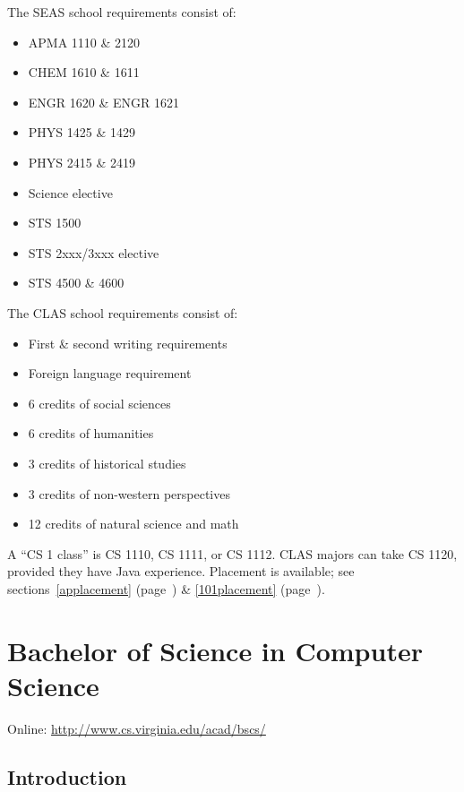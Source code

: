 \documentclass[10pt,letter,twocolumn]{book}
\newenvironment{itemlist}{
\begin{itemize}
\setlength{\itemsep}{0pt}
\setlength{\parskip}{0pt}}
{\end{itemize}}
\newcommand{\mychapter}[2]{\chapter{#1}\renewcommand{\leftmark}{\textsc{#2}}}
\newcommand{\mysection}[1]{\section{#1}\renewcommand{\rightmark}{#1}}
\begin{document}
The SEAS school requirements consist of:
\begin{itemlist}
\item APMA 1110 \& 2120
\item CHEM 1610 \& 1611
\item ENGR 1620 \& ENGR 1621
\item PHYS 1425 \& 1429
\item PHYS 2415 \& 2419
\item Science elective
\item STS 1500
\item STS 2xxx/3xxx elective
\item STS 4500 \& 4600
\end{itemlist}

The CLAS school requirements consist of:
\begin{itemlist}
\item First \& second writing requirements
\item Foreign language requirement
\item 6 credits of social sciences
\item 6 credits of humanities
\item 3 credits of historical studies
\item 3 credits of non-western perspectives
\item 12 credits of natural science and math
\end{itemlist}


 A ``CS 1 class'' is CS
1110, CS 1111, or CS 1112.  CLAS majors can take CS 1120, provided
they have Java experience.  Placement is available; see
sections~\ref{applacement} (page~\pageref{applacement}) \&
\ref{101placement} (page~\pageref{101placement}).

\clearpage
\mychapter{Bachelor of Science in Computer Science}{BS CS Degree}
\label{bscschapter}

\noindent Online: \url{http://www.cs.virginia.edu/acad/bscs/}

\mysection{Introduction}

\end{document}
